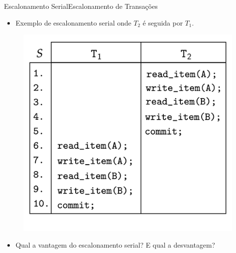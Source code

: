 \documentclass[t]{beamer}
\begin{document}

\begin{ftst}{Escalonamento Serial}{Escalonamento de Transações}

\begin{itemize}
    \item Exemplo de escalonamento serial onde $T_2$ é seguida por $T_1$.
\end{itemize}
\begin{figure}
    \centering
    \includegraphics[scale=0.14]{Figuras_transacoes/13.png}
\end{figure}
\small
\begin{itemize}
    \item Qual a vantagem do escalonamento serial? E qual a desvantagem?
\end{itemize}
\end{ftst}

\end{document}

